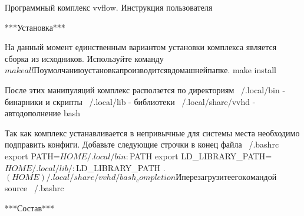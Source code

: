 Программный комплекс vvflow. Инструкция пользователя

***Установка***

На данный момент единственным вариантом установки комплекса является сборка
из исходников. Используйте команду
$ make all

По умолчанию установка производится в домашней папке.
$ make install

После этих манипуляций комплекс расползется по директориям
~/.local/bin - бинарники и скрипты
~/.local/lib - библиотеки
~/.local/share/vvhd - автодополнение bash

Так как комплекс устанавливается в непривычные для системы места необходимо
подправить конфиги. Добавьте следующие строчки в конец файла ~/.bashrc
export PATH=$HOME/.local/bin:$PATH
export LD_LIBRARY_PATH=$HOME/.local/lib/:$LD_LIBRARY_PATH
. $(HOME)/.local/share/vvhd/bash_completion

И перезагрузите его командой
$ source ~/.bashrc

***Состав***


